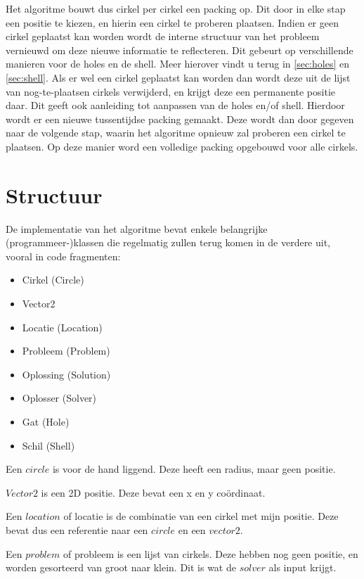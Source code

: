 \documentclass[12pt,a4paper,oneside]{book}
\begin{document}
Het algoritme bouwt dus cirkel per cirkel een packing op.
Dit door in elke stap een positie te kiezen, en hierin een cirkel te proberen plaatsen.
Indien er geen cirkel geplaatst kan worden wordt de interne structuur van het probleem vernieuwd om deze nieuwe informatie te reflecteren.
Dit gebeurt op verschillende manieren voor de holes en de shell.
Meer hierover vindt u terug in \autoref{sec:holes} en \autoref{sec:shell}.
Als er wel een cirkel geplaatst kan worden dan wordt deze uit de lijst van nog-te-plaatsen cirkels verwijderd, en krijgt deze een permanente positie daar.
Dit geeft ook aanleiding tot aanpassen van de holes en/of shell.
Hierdoor wordt er een nieuwe tussentijdse packing gemaakt.
Deze wordt dan door gegeven naar de volgende stap, waarin het algoritme opnieuw zal proberen een cirkel te plaatsen.
Op deze manier word een volledige packing opgebouwd voor alle cirkels.

\section{Structuur}

De implementatie van het algoritme bevat enkele belangrijke (programmeer-)klassen die regelmatig zullen terug komen in de verdere uit, vooral in code fragmenten:

\begin{itemize} 
\item Cirkel (Circle)
\item Vector2
\item Locatie (Location)
\item Probleem (Problem)
\item Oplossing (Solution)
\item Oplosser (Solver)
\item Gat (Hole)
\item Schil (Shell)
\end{itemize}

Een $circle$ is voor de hand liggend. Deze heeft een radius, maar geen positie.

$Vector2$ is een 2D positie. Deze bevat een x en y coördinaat.

Een $location$ of locatie is de combinatie van een cirkel met mijn positie. Deze bevat dus een referentie naar een $circle$ en een $vector2$.

Een $problem$ of probleem is een lijst van cirkels.
Deze hebben nog geen positie, en worden gesorteerd van groot naar klein.
Dit is wat de $solver$ als input krijgt.
\end{document}
